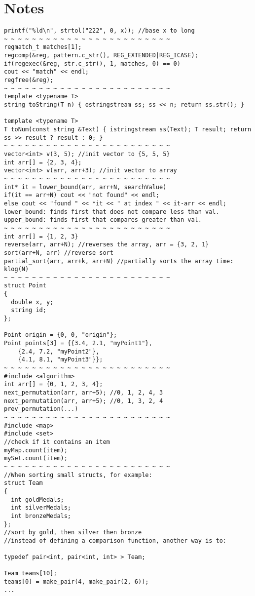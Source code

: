 \documentclass[11pt, oneside]{article}
\begin{document}
\section{Notes}
\begin{lstlisting}
printf("%ld\n", strtol("222", 0, x)); //base x to long
~ ~ ~ ~ ~ ~ ~ ~ ~ ~ ~ ~ ~ ~ ~ ~ ~ ~ ~ ~ ~ ~ ~ ~
regmatch_t matches[1];
regcomp(&reg, pattern.c_str(), REG_EXTENDED|REG_ICASE);
if(regexec(&reg, str.c_str(), 1, matches, 0) == 0)
cout << "match" << endl;
regfree(&reg);
~ ~ ~ ~ ~ ~ ~ ~ ~ ~ ~ ~ ~ ~ ~ ~ ~ ~ ~ ~ ~ ~ ~ ~
template <typename T>
string toString(T n) { ostringstream ss; ss << n; return ss.str(); }

template <typename T>
T toNum(const string &Text) { istringstream ss(Text); T result; return ss >> result ? result : 0; }
~ ~ ~ ~ ~ ~ ~ ~ ~ ~ ~ ~ ~ ~ ~ ~ ~ ~ ~ ~ ~ ~ ~ ~
vector<int> v(3, 5); //init vector to {5, 5, 5}
int arr[] = {2, 3, 4};
vector<int> v(arr, arr+3); //init vector to array
~ ~ ~ ~ ~ ~ ~ ~ ~ ~ ~ ~ ~ ~ ~ ~ ~ ~ ~ ~ ~ ~ ~ ~
int* it = lower_bound(arr, arr+N, searchValue)
if(it == arr+N) cout << "not found" << endl;
else cout << "found " << *it << " at index " << it-arr << endl;
lower_bound: finds first that does not compare less than val.
upper_bound: finds first that compares greater than val.
~ ~ ~ ~ ~ ~ ~ ~ ~ ~ ~ ~ ~ ~ ~ ~ ~ ~ ~ ~ ~ ~ ~ ~
int arr[] = {1, 2, 3}
reverse(arr, arr+N); //reverses the array, arr = {3, 2, 1}
sort(arr+N, arr) //reverse sort
partial_sort(arr, arr+k, arr+N) //partially sorts the array time: klog(N)
~ ~ ~ ~ ~ ~ ~ ~ ~ ~ ~ ~ ~ ~ ~ ~ ~ ~ ~ ~ ~ ~ ~ ~
struct Point
{
  double x, y;
  string id;
};

Point origin = {0, 0, "origin"};
Point points[3] = {{3.4, 2.1, "myPoint1"},
    {2.4, 7.2, "myPoint2"},
    {4.1, 8.1, "myPoint3"}};
~ ~ ~ ~ ~ ~ ~ ~ ~ ~ ~ ~ ~ ~ ~ ~ ~ ~ ~ ~ ~ ~ ~ ~
#include <algorithm>
int arr[] = {0, 1, 2, 3, 4};
next_permutation(arr, arr+5); //0, 1, 2, 4, 3
next_permutation(arr, arr+5); //0, 1, 3, 2, 4
prev_permutation(...)
~ ~ ~ ~ ~ ~ ~ ~ ~ ~ ~ ~ ~ ~ ~ ~ ~ ~ ~ ~ ~ ~ ~ ~
#include <map>
#include <set>
//check if it contains an item
myMap.count(item);
mySet.count(item);
~ ~ ~ ~ ~ ~ ~ ~ ~ ~ ~ ~ ~ ~ ~ ~ ~ ~ ~ ~ ~ ~ ~ ~
//When sorting small structs, for example:
struct Team
{
  int goldMedals;
  int silverMedals;
  int bronzeMedals;
};
//sort by gold, then silver then bronze
//instead of defining a comparison function, another way is to:

typedef pair<int, pair<int, int> > Team;

Team teams[10];
teams[0] = make_pair(4, make_pair(2, 6));
...


\end{lstlisting}
\end{document}
